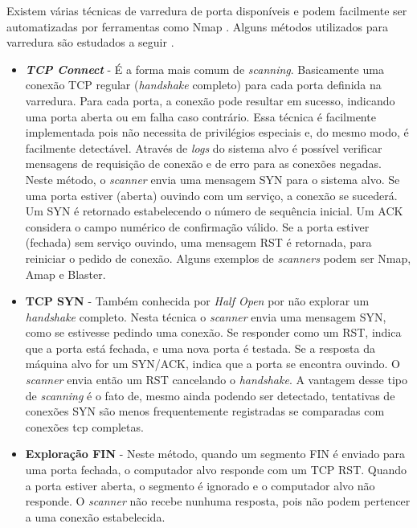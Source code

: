 Existem várias técnicas de varredura de porta disponíveis e podem facilmente ser automatizadas por ferramentas como Nmap \cite{Lyon:2009}. Alguns métodos utilizados para varredura são estudados a seguir \cite{deVivo:1999, Christopher:2001}.
\begin{itemize}
\item \textbf{\textit{TCP Connect}} - É a forma mais comum de \textit{scanning}. Basicamente uma conexão TCP regular (\textit{handshake} completo) para cada porta definida na varredura. Para cada porta, a conexão pode resultar em sucesso, indicando uma porta aberta ou em falha caso contrário. Essa técnica é facilmente implementada pois não necessita de privilégios especiais e, do mesmo modo, é facilmente detectável. Através de \textit{logs} do sistema alvo é possível verificar mensagens de requisição de conexão e de erro para as conexões negadas. Neste método, o \textit{scanner} envia uma mensagem SYN para o sistema alvo. Se uma porta estiver (aberta) ouvindo com um serviço, a conexão se sucederá. Um SYN é retornado estabelecendo o número de sequência inicial. Um ACK considera o campo numérico de confirmação válido. Se a porta estiver (fechada) sem serviço ouvindo, uma mensagem RST é retornada, para reiniciar o pedido de conexão. Alguns exemplos de \textit{scanners} podem ser Nmap, Amap e Blaster. %

\item \textbf{TCP SYN} - Também conhecida por \textit{Half Open} por não explorar um \textit{handshake} completo. Nesta técnica o \textit{scanner} envia uma mensagem SYN, como se estivesse pedindo uma conexão. Se responder como um RST, indica que a porta está fechada, e uma nova porta é testada. Se a resposta da máquina alvo for um SYN/ACK, indica que a porta se encontra ouvindo. O \textit{scanner} envia então um RST cancelando o \textit{handshake}. A vantagem desse tipo de \textit{scanning} é o fato de, mesmo ainda podendo ser detectado, tentativas de conexões SYN são menos frequentemente registradas se comparadas com conexões \gls{tcp} completas. %

\item \textbf{Exploração FIN} - Neste método, quando um segmento FIN é enviado para uma porta fechada, o computador alvo responde com um TCP RST. Quando a porta estiver aberta, o segmento é ignorado e o computador alvo não responde. O \textit{scanner} não recebe nunhuma resposta, pois não podem pertencer a uma conexão estabelecida. %


\end{itemize}
